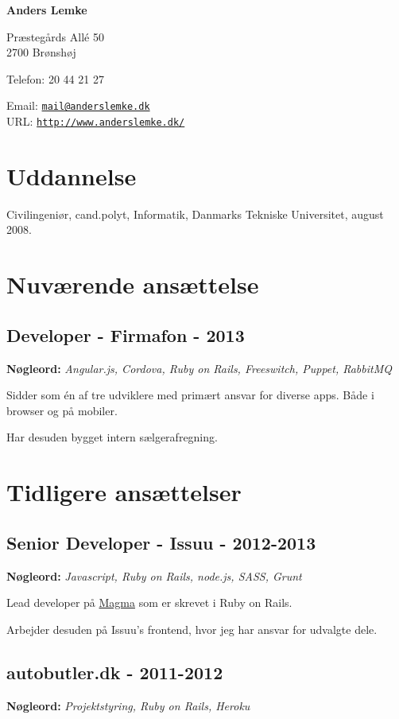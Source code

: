 \documentclass[a4paper]{article}
\newcommand{\keywords}[1]{\small\textbf{Nøgleord:} \emph{#1}\normalsize}
\begin{document}
{\huge\bf Anders Lemke}

\bigskip
Præstegårds Allé 50 \\
2700 Brønshøj

\medskip

Telefon: 20 44 21 27

\medskip

Email: \href{mailto:mail@anderslemke.dk}{\tt mail@anderslemke.dk} \\
URL: \href{http://www.anderslemke.dk/}{\tt http://www.anderslemke.dk/}

\section*{Uddannelse}

Civilingeniør, cand.polyt, Informatik, Danmarks Tekniske Universitet, august 2008.

\section*{Nuværende ansættelse}

\subsection*{Developer - Firmafon - 2013}
\keywords{Angular.js, Cordova, Ruby on Rails, Freeswitch, Puppet, RabbitMQ}

Sidder som én af tre udviklere med primært ansvar for diverse apps. Både i browser og på mobiler.

Har desuden bygget intern sælgerafregning.

\section*{Tidligere ansættelser}

\subsection*{Senior Developer - Issuu - 2012-2013}
\keywords{Javascript, Ruby on Rails, node.js, SASS, Grunt}

Lead developer på \href{http://www.magmahq.com}{Magma} som er skrevet i Ruby on Rails.

Arbejder desuden på Issuu's frontend, hvor jeg har ansvar for udvalgte dele.

\subsection*{autobutler.dk - 2011-2012}
\keywords{Projektstyring, Ruby on Rails, Heroku}
\end{document}
